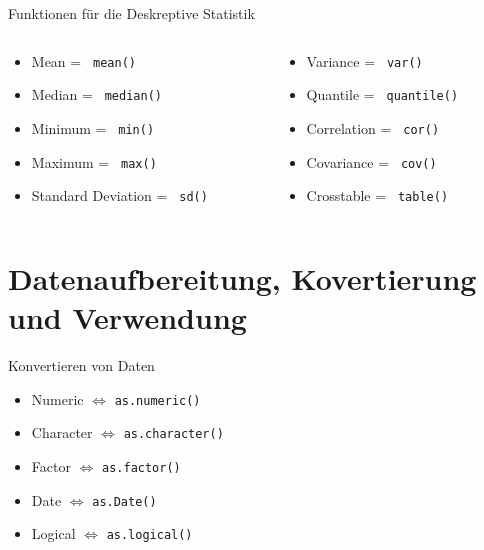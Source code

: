 \documentclass[xcolor=dvipsnames, aspectratio = 169]{beamer}
\begin{document}
\begin{frame}[fragile]{Funktionen für die Deskreptive Statistik}
\begin{columns}[T]
	\begin{column}{0.5\textwidth}
		\begin{itemize}
			\item Mean = \verb+ mean() +
			\item Median = \verb+ median() +
			\item Minimum = \verb+ min() +
			\item Maximum = \verb+ max() +
			\item Standard Deviation = \verb+ sd() +
		\end{itemize}
	\end{column}
	\begin{column}{0.5\textwidth}
		\begin{itemize}
			\item Variance = \verb+ var() +
			\item Quantile = \verb+ quantile() +
			\item Correlation = \verb+ cor() +
			\item Covariance = \verb+ cov() +
			\item Crosstable = \verb+ table() +
		\end{itemize}
	\end{column}
\end{columns}
\end{frame}


\section{Datenaufbereitung, Kovertierung und Verwendung}
\begin{frame}[fragile]{Konvertieren von Daten}
	\begin{itemize}
		\item Numeric $\Leftrightarrow$ \verb+as.numeric()+
		\item Character $\Leftrightarrow$ \verb+as.character()+
		\item Factor $\Leftrightarrow$ \verb+as.factor()+
		\item Date $\Leftrightarrow$ \verb+as.Date()+
		\item Logical $\Leftrightarrow$ \verb+as.logical()+
	\end{itemize}
\end{frame}
\end{document}
